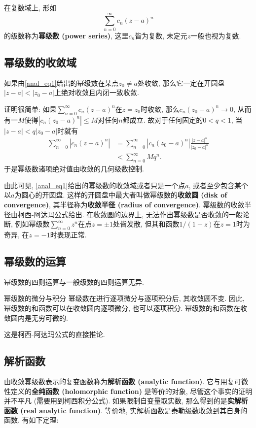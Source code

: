 
在复数域上, 形如
\begin{equation}\label{anal_eq1}
\sum_{n=0}^\infty c_n(z-a)^n
\end{equation}
的级数称为\textbf{幂级数 (power series)}, 这里$c_n$皆为复数, 未定元$z$一般也视为复数. 

\subsection{幂级数的收敛域}
\begin{theorem}{}
如果由\autoref{anal_eq1}给出的幂级数在某点$z_0\neq a$处收敛, 那么它一定在开圆盘$|z-a|<|z_0-a|$上绝对收敛且内闭一致收敛.
\end{theorem}

证明很简单: 如果$\sum_{n=0}^\infty c_n(z-a)^n$在$z=z_0$时收敛, 那么$c_n(z_0-a)^n\to0$, 从而有一$M$使得$|c_n(z_0-a)^n|\leq M$对任何$n$都成立. 故对于任何固定的$0<q<1$, 当$|z-a|<q|z_0-a|$时就有
$$
\begin{aligned}
\sum_{n=0}^\infty |c_n(z-a)^n|
&=\sum_{n=0}^\infty |c_n(z_0-a)^n|\frac{|z-a|^n}{|z_0-a|^n}\\
&<\sum_{n=0}^\infty Mq^n.
\end{aligned}
$$
于是幂级数诸项绝对值由收敛的几何级数控制.

由此可见, \autoref{anal_eq1}给出的幂级数的收敛域或者只是一个点$a$, 或者至少包含某个以$a$为圆心的开圆盘. 这样的开圆盘中最大者叫做幂级数的\textbf{收敛圆 (disk of convergence)}, 其半径称为\textbf{收敛半径 (radius of convergence)}. 幂级数的收敛半径由柯西-阿达玛公式给出. 在收敛圆的边界上, 无法作出幂级数是否收敛的一般论断, 例如幂级数$\sum_{n=0}^\infty z^n$在点$z=\pm1$处皆发散, 但其和函数$1/(1-z)$在$z=1$时为奇异, 在$z=-1$时表现正常.

\subsection{幂级数的运算}
幂级数的四则运算与一般级数的四则运算无异.

\begin{theorem}{幂级数的微分与积分}
幂级数在进行逐项微分与逐项积分后, 其收敛圆不变. 因此, 幂级数的和函数可以在收敛圆内逐项微分, 也可以逐项积分. 幂级数的和函数在收敛圆内是无穷可微的.
\end{theorem}
这是柯西-阿达玛公式的直接推论. 

\subsection{解析函数}
由收敛幂级数表示的复变函数称为\textbf{解析函数 (analytic function)}. 它与用复可微性定义的\textbf{全纯函数 (holomorphic function)} 是等价的对象, 尽管这个事实的证明并不平凡 (需要用到柯西积分公式). 如果限制自变量取实数, 那么得到的是\textbf{实解析函数 (real analytic function)}. 等价地, 实解析函数是泰勒级数收敛到其自身的函数. 有如下定理:


